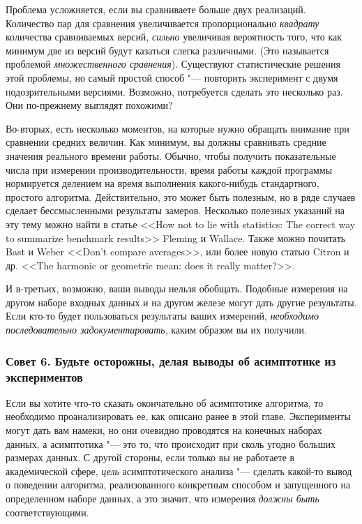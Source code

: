 \noindent{}

Проблема усложняется, если вы сравниваете больше двух реализаций. Количество пар для сравнения увеличивается пропорционально \textit{квадрату} количества сравниваемых версий, \textit{сильно} увеличивая вероятность того, что как минимум две из версий будут казаться слегка различными. (Это называется проблемой \textit{множественного сравнения}). Существуют статистические решения этой проблемы, но самый простой способ "--- повторить эксперимент с двумя подозрительными версиями. Возможно, потребуется сделать это несколько раз. Они по-прежнему выглядят похожими?

Во-вторых, есть несколько моментов, на которые нужно обращать внимание при сравнении средних величин. Как минимум, вы должны сравнивать средние значения реального времени работы. Обычно, чтобы получить показательные числа при измерении производительности, время работы каждой программы нормируется делением на время выполнения какого-нибудь стандартного, простого алгоритма. Действительно, это может быть полезным, но в ряде случаев сделает бессмысленными результаты замеров. Несколько полезных указаний на эту тему можно найти в статье <<How not to lie with statistics: The correct way to summarize benchmark results>> Fleming и Wallace. Также можно почитать Bast и Weber <<Don't compare averages>>, или более новую статью Citron и др. <<The harmonic or geometric mean: does it really matter?>>.

И в-третьих, возможно, ваши выводы нельзя обобщать. Подобные измерения на другом наборе входных данных и на другом железе могут дать другие результаты. Если кто-то будет пользоваться результаты ваших измерений, \textit{необходимо последовательно задокументировать}, каким образом вы их получили.

\subsubsection*{Совет 6. Будьте осторожны, делая выводы об асимптотике из экспериментов}

Если вы хотите что-то сказать окончательно об асимптотике алгоритма, то необходимо проанализировать ее, как описано ранее в этой главе. Эксперименты могут дать вам намеки, но они очевидно проводятся на конечных наборах данных, а асимптотика "--- это то, что происходит при сколь угодно больших размерах данных. С другой стороны, если только вы не работаете в академической сфере, \textit{цель} асимптотического анализа "--- сделать какой-то вывод о поведении алгоритма, реализованного конкретным способом и запущенного на определенном наборе данных, а это значит, что измерения \textit{должны быть} соответствующими.

